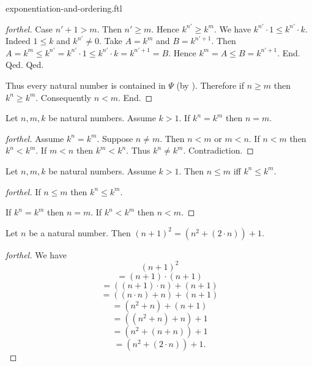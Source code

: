 \documentclass{naproche-library}
\begin{document}
\begin{smodule}{exponentiation-and-ordering.ftl}
\begin{proof}[forthel]
          Case $n' + 1 > m$.
            Then $n' \geq m$.
            Hence $k^{n'} \geq k^{m}$.
            We have $k^{n'} \cdot 1 \leq k^{n'} \cdot k$.
            Indeed $1 \leq k$ and $k^{n'} \neq 0$.
            Take $A = k^{m}$ and $B = k^{n' + 1}$. %
            Then $A
              = k^{m}
              \leq k^{n'}
              = k^{n'} \cdot 1
              \leq k^{n'} \cdot k
              = k^{n' + 1}
              = B$.
            Hence $k^{m} = A \leq B = k^{n' + 1}$.
          End.
        Qed.
      Qed.

      Thus every natural number is contained in $\Psi$ (by ).
      Therefore if $n \geq m$ then $k^{n} \geq k^{m}$.
      Consequently $n < m$.
    End.
  \end{proof}

  \begin{corollary}[forthel,id=ARITHMETIC_09_6780506905509888,printid]
    Let $n, m, k$ be natural numbers.
    Assume $k > 1$.
    If $k^{n} = k^{m}$ then $n = m$.
  \end{corollary}
  \begin{proof}[forthel]
    Assume $k^{n} = k^{m}$.
    Suppose $n \neq m$.
    Then $n < m$ or $m < n$.
    If $n < m$ then $k^{n} < k^{m}$.
    If $m < n$ then $k^{m} < k^{n}$.
    Thus $k^{n} \neq k^{m}$.
    Contradiction.
  \end{proof}

  \begin{corollary}[forthel,id=ARITHMETIC_09_2876620253691904,printid]
    Let $n, m, k$ be natural numbers.
    Assume $k > 1$.
    Then $n \leq m$ iff $k^{n} \leq k^{m}$.
  \end{corollary}
  \begin{proof}[forthel]
    If $n \leq m$ then $k^{n} \leq k^{m}$.

    If $k^{n} = k^{m}$ then $n = m$.
    If $k^{n} < k^{m}$ then $n < m$.
  \end{proof}

  \begin{proposition}[forthel,id=ARITHMETIC_09_6984104377581568,printid]
    Let $n$ be a natural number.
    Then $(n + 1)^{2} = (n^{2} + (2 \cdot n)) + 1$.
  \end{proposition}
  \begin{proof}[forthel]
    We have
    \[  (n + 1)^{2}                       \]
    \[    = (n + 1) \cdot (n + 1)         \]
    \[    = ((n + 1) \cdot n) + (n + 1)   \]
    \[    = ((n \cdot n) + n) + (n + 1)   \]
    \[    = (n^{2} + n) + (n + 1)         \]
    \[    = ((n^{2} + n) + n) + 1         \]
    \[    = (n^{2} + (n + n)) + 1         \]
    \[    = (n^{2} + (2 \cdot n)) + 1.    \]
  \end{proof}


\end{smodule}
\end{document}
